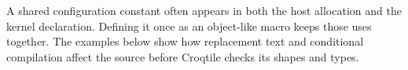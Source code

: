 A shared configuration constant often appears in both the host allocation and the kernel declaration. Defining it once as an object-like macro keeps those uses together. The examples below show how replacement text and conditional compilation affect the source before Croqtile checks its shapes and types.
